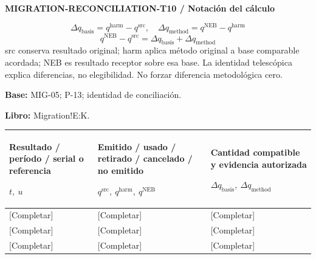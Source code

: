 \par\begingroup\sffamily\fontsize{8}{10}\selectfont\color{NEBGreen}\setlength{\parskip}{2pt}\setlength{\abovedisplayskip}{4pt}\setlength{\belowdisplayskip}{4pt}\setlength{\abovedisplayshortskip}{2pt}\setlength{\belowdisplayshortskip}{3pt}
\textbf{MIGRATION-RECONCILIATION-T10 / Notación del cálculo}\par
{\fontsize{9}{11}\selectfont\[ \Delta q_{\mathrm{basis}}=q^{\mathrm{harm}}-q^{\mathrm{src}},\quad \Delta q_{\mathrm{method}}=q^{\mathrm{NEB}}-q^{\mathrm{harm}} \]}
{\fontsize{9}{11}\selectfont\[ q^{\mathrm{NEB}}-q^{\mathrm{src}}=\Delta q_{\mathrm{basis}}+\Delta q_{\mathrm{method}} \]}
src conserva resultado original; harm aplica método original a base comparable acordada; NEB es resultado receptor sobre esa base. La identidad telescópica explica diferencias, no elegibilidad. No forzar diferencia metodológica cero.\par
\textbf{Base:} MIG-05; P-13; identidad de conciliación.\par
\textbf{Libro:} Migration!E:K.\par\endgroup
{\sffamily\fontsize{8.3}{10.3}\selectfont\begin{longtable}{@{}P{54.83mm} P{54.83mm} P{54.83mm}@{}}
\toprule
\textbf{Resultado / período / serial o referencia}\par {\normalfont\fontsize{8.2}{10}\selectfont $t,\ u$} & \textbf{Emitido / usado / retirado / cancelado / no emitido}\par {\normalfont\fontsize{8.2}{10}\selectfont $q^{\mathrm{src}},\ q^{\mathrm{harm}},\ q^{\mathrm{NEB}}$} & \textbf{Cantidad compatible y evidencia autorizada}\par {\normalfont\fontsize{8.2}{10}\selectfont $\Delta q_{\mathrm{basis}},\ \Delta q_{\mathrm{method}}$}\\\midrule\endhead
\rule{0pt}{8mm}[Completar] & [Completar] & [Completar]\\\hline
\rule{0pt}{8mm}[Completar] & [Completar] & [Completar]\\\hline
\rule{0pt}{8mm}[Completar] & [Completar] & [Completar]\\\hline
\end{longtable}}
\par\begingroup\sffamily\fontsize{8}{10}\selectfont\color{NEBGreen}\setlength{\parskip}{2pt}\setlength{\abovedisplayskip}{4pt}\setlength{\belowdisplayskip}{4pt}\setlength{\abovedisplayshortskip}{2pt}\setlength{\belowdisplayshortskip}{3pt}
